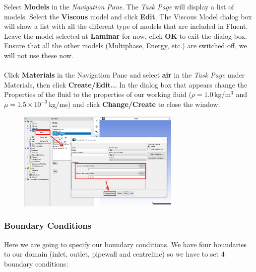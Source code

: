 \documentclass[11pt,a4paper,oneside]{scrartcl}
\newcommand\bfr[1]{\textcolor[rgb]{1,0.00,0.00}{\textbf{\textsf{#1}}}}
\begin{document}
Select \bfr{Models} in the\emph{ Navigation Pane}. The \emph{Task Page} will display a list of models. Select the \bfr{Viscous} model and click \bfr{Edit}. The Viscous Model dialog box will show a list with all the different type of models that are included in Fluent. Leave the model selected at \bfr{Laminar} for now, click \bfr{OK} to exit the dialog box. Ensure that all the other models (Multiphase, Energy, etc.) are switched off, we will not use these now.
\\
\\
Click \bfr{Materials} in the Navigation Pane and select \bfr{air} in the \emph{Task Page} under Materials, then click \bfr{Create/Edit..}.  In the dialog box that appears change the Properties of the fluid to the properties of our working fluid ($\rho=1.0$\,kg/m$^3$ and $\mu=1.5\times10^{-3}$\,kg/ms) and click \bfr{Change/Create} to close the window.
\begin{figure}[H]
\begin{center}
\includegraphics[width=0.7\textwidth,clip]{fluid_properties.png}
\end{center}
\end{figure}

\subsubsection{Boundary Conditions}

Here we are going to specify our boundary conditions. We have four boundaries to our domain (inlet, outlet, pipewall and centreline) so we have to set 4 boundary conditions:
\end{document}
